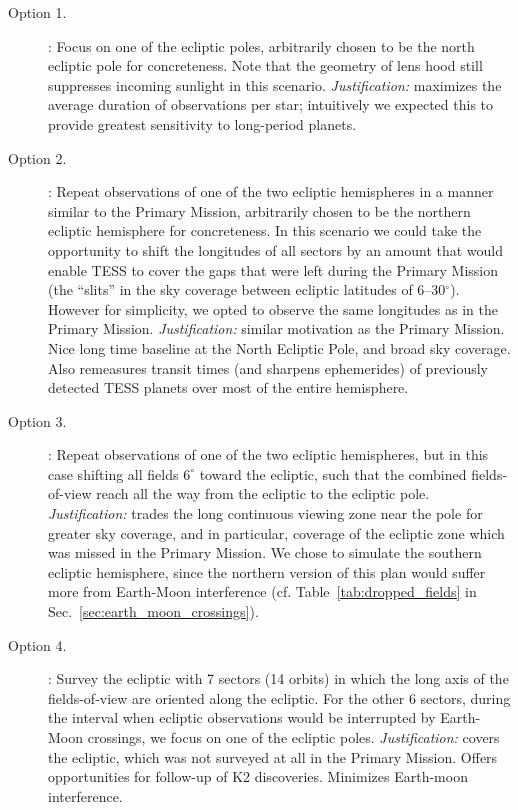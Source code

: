 \begin{description}

\item[Option 1.] \npole: Focus on one of the ecliptic poles,
  arbitrarily chosen to be the north ecliptic pole for
  concreteness. Note that the geometry of \tesss lens hood still
  suppresses incoming sunlight in this scenario.
  \textit{Justification:} maximizes the average duration of
  observations per star; intuitively we expected this to provide
  greatest sensitivity to long-period planets.

\item[Option 2.] \nhemi: Repeat observations of one of the two
  ecliptic hemispheres in a manner similar to the Primary Mission,
  arbitrarily chosen to be the northern ecliptic hemisphere for
  concreteness. In this scenario we could take the opportunity to 
  shift the longitudes of all sectors by an amount that would enable 
  TESS to cover the gaps that were left during the Primary Mission 
  (the ``slits'' in the sky coverage between ecliptic latitudes of 
  6--30$^\circ$).
  However for simplicity, we opted to observe the same longitudes as
  in the Primary Mission.
  \textit{Justification:} similar motivation as the Primary Mission.
  Nice long time baseline at the North Ecliptic Pole, and broad sky
  coverage. Also remeasures transit times (and sharpens ephemerides)
  of previously detected TESS planets over most of the entire
  hemisphere.

\item[Option 3.] \shemiAvoid: Repeat observations of one of the two
  ecliptic hemispheres, but in this case shifting all fields $6^\circ$
  toward the ecliptic, such that the combined fields-of-view reach all
  the way from the ecliptic to the ecliptic pole.
  \textit{Justification:} trades the long continuous viewing zone near
  the pole for greater sky coverage, and in particular, coverage of
  the ecliptic zone which was missed in the Primary Mission.  We chose
  to simulate the southern ecliptic hemisphere, since the northern
  version of this plan would suffer more from Earth-Moon interference
  (cf. Table~\ref{tab:dropped_fields} in
  Sec.~\ref{sec:earth_moon_crossings}).
  
\item[Option 4.] \elong: Survey the ecliptic with 7 sectors (14
  orbits) in which the long axis of the fields-of-view are oriented
  along the ecliptic.  For the other 6 sectors, during the interval
  when ecliptic observations would be interrupted by Earth-Moon
  crossings, we focus on one of the ecliptic poles.
  \textit{Justification:} covers the ecliptic, which was not surveyed
  at all in the Primary Mission.  Offers opportunities for follow-up
  of K2 discoveries. Minimizes Earth-moon interference.
  

\end{description}
